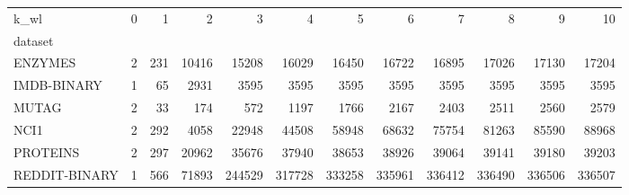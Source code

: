 \begin{tabular}{lrrrrrrrrrrr}
\toprule
k_wl & 0 & 1 & 2 & 3 & 4 & 5 & 6 & 7 & 8 & 9 & 10 \\
dataset &  &  &  &  &  &  &  &  &  &  &  \\
\midrule
ENZYMES & 2 & 231 & 10416 & 15208 & 16029 & 16450 & 16722 & 16895 & 17026 & 17130 & 17204 \\
IMDB-BINARY & 1 & 65 & 2931 & 3595 & 3595 & 3595 & 3595 & 3595 & 3595 & 3595 & 3595 \\
MUTAG & 2 & 33 & 174 & 572 & 1197 & 1766 & 2167 & 2403 & 2511 & 2560 & 2579 \\
NCI1 & 2 & 292 & 4058 & 22948 & 44508 & 58948 & 68632 & 75754 & 81263 & 85590 & 88968 \\
PROTEINS & 2 & 297 & 20962 & 35676 & 37940 & 38653 & 38926 & 39064 & 39141 & 39180 & 39203 \\
REDDIT-BINARY & 1 & 566 & 71893 & 244529 & 317728 & 333258 & 335961 & 336412 & 336490 & 336506 & 336507 \\
\bottomrule
\end{tabular}
